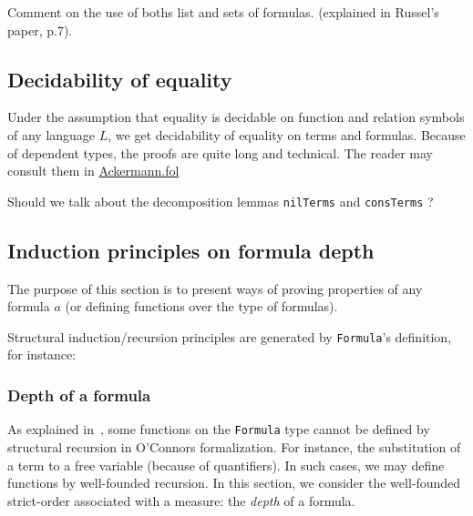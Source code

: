 \begin{todo}
Comment on the use of boths list and sets of formulas.
(explained in Russel's paper, p.7).


\end{todo}


\subsection{Decidability of equality}

Under the assumption that equality is decidable on 
function and relation symbols of any language $L$,
we get decidability of equality on terms and formulas.
Because of dependent types, the proofs are quite long and technical. The reader may consult them in \href{../theories/html/hydras.Ackermann.fol.html}{Ackermann.fol}

\begin{todo}
  Should we talk about the decomposition lemmas
\texttt{nilTerms} and \texttt{consTerms} ?
\end{todo}


\subsection{Induction principles on formula depth}

The purpose of this section is to present ways of proving 
properties of any formula $a$ (or defining functions over the type of formulas).

Structural induction/recursion principles are generated by 
\texttt{Formula}'s definition, for instance:








\subsubsection{Depth of a formula}
As explained in~\cite{OConnor05}, some functions on the \texttt{Formula} type cannot be defined by structural recursion in 
O'Connors formalization. For instance, the substitution of a term to a free variable (because of quantifiers). 
In such cases, we may define functions by well-founded recursion. In this section, we consider the well-founded strict-order associated with a measure: the \emph{depth} of a formula.

